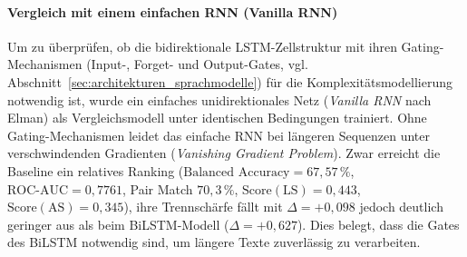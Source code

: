 \paragraph{Vergleich mit einem einfachen RNN (Vanilla RNN)}
Um zu überprüfen, ob die bidirektionale LSTM-Zellstruktur mit ihren Gating-Mechanismen (Input-, Forget- und Output-Gates, vgl. Abschnitt~\ref{sec:architekturen_sprachmodelle}) für die Komplexitätsmodellierung notwendig ist, wurde ein einfaches unidirektionales Netz (\textit{Vanilla RNN} nach Elman) als Vergleichsmodell unter identischen Bedingungen trainiert. Ohne Gating-Mechanismen leidet das einfache RNN bei längeren Sequenzen unter verschwindenden Gradienten (\textit{Vanishing Gradient Problem}). Zwar erreicht die Baseline ein relatives Ranking ($\text{Balanced Accuracy} = 67{,}57\,\%$, $\text{ROC-AUC} = 0{,}7761$, Pair Match $70{,}3\,\%$, $\text{Score}(\text{LS}) = 0{,}443$, $\text{Score}(\text{AS}) = 0{,}345$), ihre Trennschärfe fällt mit $\Delta = +0{,}098$ jedoch deutlich geringer aus als beim BiLSTM-Modell ($\Delta = +0{,}627$). Dies belegt, dass die Gates des BiLSTM notwendig sind, um längere Texte zuverlässig zu verarbeiten.

